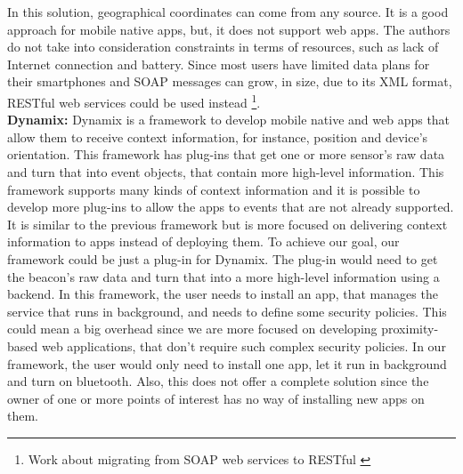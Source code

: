In this solution, geographical coordinates can
come from any source. It is a good approach for
mobile native apps, but, it does not support web apps.
The authors do not take into consideration
constraints in terms of resources, such as
lack of Internet connection and battery.
Since most users have limited data plans for
their smartphones and SOAP messages can
grow, in size, due to its XML format,
RESTful \cite{richardson2008restful}
web services could be used instead
\footnote{Work about migrating from SOAP web services
to RESTful \cite{upadhyaya2011migration}}.
\\
\textbf{Dynamix:}
Dynamix \cite{Carlson2012} is a framework to develop
mobile native and web apps that allow them to receive
context information, for instance, position and device's
orientation. This framework has plug-ins that get
one or more sensor's raw data and turn that into event
objects, that contain more high-level information.
This framework supports many kinds of context information
and it is possible to develop more plug-ins to allow the
apps to events that are not
already supported. It is similar to the previous
framework but is more focused on delivering context
information to apps instead of deploying them.
To achieve our goal, our framework could be just a
plug-in for Dynamix. The plug-in would
need to get the beacon's raw data and
turn that into a more high-level information 
using a backend. In this framework,
the user needs to install an app, that manages the service
that runs in background, and needs to define some
security policies. This could mean a big overhead since
we are more focused on developing proximity-based
web applications, that don't require such complex security
policies. In our framework, the user would only need to
install one app, let it run in background and turn on
bluetooth. Also, this does not offer a complete solution
since the owner of one or more points of interest
has no way of installing new apps on them.

